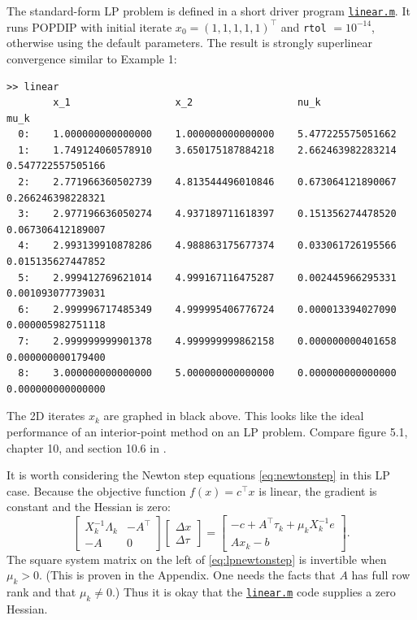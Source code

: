 \documentclass[11pt]{article}
\begin{document}
The standard-form LP problem is defined in a short driver program \href{https://github.com/bueler/popdip/blob/main/matlab/linear.m}{\texttt{linear.m}}.  It runs POPDIP with initial iterate $x_0=(1,1,1,1,1)^\top$ and \texttt{rtol} $=10^{-14}$, otherwise using the default parameters.  The result is strongly superlinear convergence similar to Example 1:
\begin{Verbatim}[fontsize=\footnotesize]
>> linear
        x_1                  x_2                  nu_k                 mu_k
  0:    1.000000000000000    1.000000000000000    5.477225575051662
  1:    1.749124060578910    3.650175187884218    2.662463982283214    0.547722557505166
  2:    2.771966360502739    4.813544496010846    0.673064121890067    0.266246398228321
  3:    2.977196636050274    4.937189711618397    0.151356274478520    0.067306412189007
  4:    2.993139910878286    4.988863175677374    0.033061726195566    0.015135627447852
  5:    2.999412769621014    4.999167116475287    0.002445966295331    0.001093077739031
  6:    2.999996717485349    4.999995406776724    0.000013394027090    0.000005982751118
  7:    2.999999999901378    4.999999999862158    0.000000000401658    0.000000000179400
  8:    3.000000000000000    5.000000000000000    0.000000000000000    0.000000000000000
\end{Verbatim}

The 2D iterates $x_k$ are graphed in black above.  This looks like the ideal performance of an interior-point method on an LP problem.  Compare figure 5.1, chapter 10, and section 10.6 in \cite{GrivaNashSofer2009}.

It is worth considering the Newton step equations \eqref{eq:newtonstep} in this LP case.  Because the objective function $f(x) = c^\top x$ is linear, the gradient is constant and the Hessian is zero:
\begin{equation}
\begin{bmatrix}
X_k^{-1}\Lambda_k  & -A^\top \\
-A                 & 0
\end{bmatrix}
\begin{bmatrix}
\Delta x \\
\Delta \tau
\end{bmatrix}
=
\begin{bmatrix}
-c + A^\top \tau_k + \mu_k X_k^{-1} e \\
A x_k - b
\end{bmatrix}. \label{eq:lpnewtonstep}
\end{equation}
The square system matrix on the left of \eqref{eq:lpnewtonstep} is invertible when $\mu_k>0$.  (This is proven in the Appendix.  One needs the facts that $A$ has full row rank and that $\mu_k\ne 0$.)  Thus it is okay that the \href{https://github.com/bueler/popdip/blob/main/matlab/linear.m}{\texttt{linear.m}} code supplies a zero Hessian.
\end{document}
